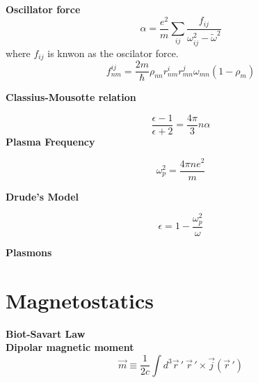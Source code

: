 \documentclass[12pt,a4paper]{article}
\begin{document}
\textbf{Oscillator force}\\
\begin{equation}
	\alpha = \frac{e^2}{m}\sum_{ij} \frac{f_{ij}}{\omega_{ij}^2-\tilde{\omega}^2}
\end{equation}
where $f_{ij}$ is knwon as the oscilator force.
\begin{equation}
	f_{nm}^{ij} = \frac{2m}{\hbar}\rho_{nn}r_{nm}^ir_{mn}^j\omega_{mn} (1-\rho_m)
\end{equation}

\textbf{Classius-Mousotte relation}

\begin{equation}
	\frac{\epsilon -1}{\epsilon + 2} = \frac{4\pi}{3}n\alpha
\end{equation}
\textbf{Plasma Frequency}

\begin{equation}
	\omega_p^2 = \frac{4\pi n e^2}{m}
\end{equation}

\textbf{Drude's Model}

\begin{equation}
	\epsilon = 1 - \frac{\omega_p^2}{\omega}
\end{equation}

\textbf{Plasmons}




\section{Magnetostatics}

\textbf{Biot-Savart Law}\\

\textbf{Dipolar magnetic moment}
\begin{equation}
	\vec{m} \equiv \frac{1}{2c} \int d^3 \vec{r}\,' \ \vec{r}\,'\times \vec{j}(\vec{r}\, ')
\end{equation}
\end{document}
